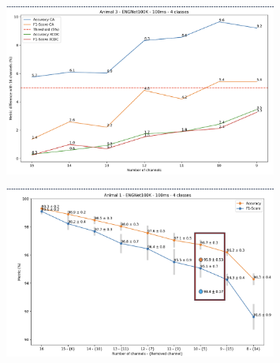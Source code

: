 \documentclass{Configuration_Files/PoliMi3i_thesis}
\begin{document}
\begin{figure}[h!]
    \centering
    \includegraphics[width=0.8\textwidth]{Results Matteo/figure16}
    \label{fig:figure1}
\end{figure}

\begin{figure}[h!]
    \centering
    \includegraphics[width=0.8\textwidth]{Results Matteo/figure17}
    \label{fig:figure1}
\end{figure}





\cleardoublepage
{} %
\appendix
\end{document}
